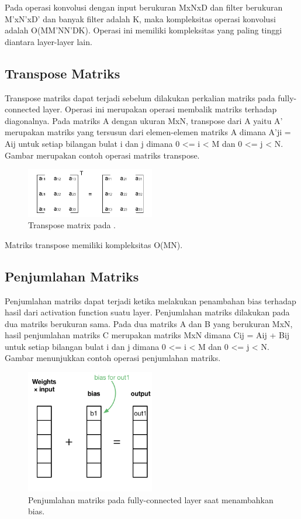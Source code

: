 Pada operasi konvolusi dengan input berukuran MxNxD dan filter berukuran M'xN'xD' dan banyak filter adalah K, maka kompleksitas operasi konvolusi adalah O(MM'NN'DK). Operasi ini memiliki kompleksitas yang paling tinggi diantara layer-layer lain. 

\subsection{Transpose Matriks}
Transpose matriks dapat terjadi sebelum dilakukan perkalian matriks pada fully-connected layer. Operasi ini merupakan operasi membalik matriks terhadap diagonalnya. Pada matriks A dengan ukuran MxN, transpose dari A yaitu A' merupakan matriks yang tersusun dari elemen-elemen matriks A dimana A'ji = Aij untuk setiap bilangan bulat i dan j dimana 0 <= i < M dan 0 <= j < N. Gambar merupakan contoh operasi matriks transpose.

\begin{figure}
	\centering
	\includegraphics[width=0.50\textwidth]
	{pics/transpose.png}
	\caption{Transpose matrix pada \deeplearning \inference.}
	\label{fig:transpose}
\end{figure}

Matriks transpose memiliki kompleksitas O(MN).

\subsection{Penjumlahan Matriks}
Penjumlahan matriks dapat terjadi ketika melakukan penambahan bias terhadap hasil dari activation function suatu layer. Penjumlahan matriks dilakukan pada dua matriks berukuran sama. Pada dua matriks A dan B yang berukuran MxN, hasil penjumlahan matriks C merupakan matriks MxN dimana Cij = Aij + Bij untuk setiap bilangan bulat i dan j dimana 0 <= i < M dan 0 <= j < N. Gambar menunjukkan contoh operasi penjumlahan matriks.

\begin{figure}
	\centering
	\includegraphics[width=0.50\textwidth]
	{pics/add.png}
	\caption{Penjumlahan matriks pada fully-connected layer saat menambahkan bias.}
	\label{fig:add}
\end{figure}


